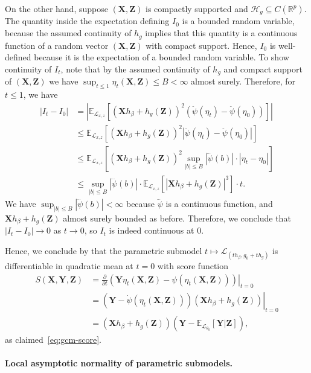 \documentclass[aos]{imsart}
\theoremstyle{plain}
\theoremstyle{remark}
\newcommand{\E}{\mathbb E}								%
\newcommand{\R}{\mathbb{R}}								%
\newcommand{\prx}{\bm X}								%
\newcommand{\prz}{\bm Z}								%
\newcommand{\pry}{{\bm Y}}								%
\newcommand{\law}{\mathcal L}							%
\renewcommand{\H}{\mathcal H}		 					%
\begin{document}
On the other hand, suppose $(\prx,\prz)$ is compactly supported and $\H_g \subseteq C(\R^p)$. The quantity inside the expectation defining $I_0$ is a bounded random variable, because the assumed continuity of $h_g$ implies that this quantity is a continuous function of a random vector $(\prx, \prz)$ with compact support. Hence, $I_0$ is well-defined because it is the expectation of a bounded random variable. To show continuity of $I_t$, note that by the assumed continuity of $h_g$ and compact support of $(\prx,\prz)$ we have $\sup_{t \leq 1} \eta_t(\prx,\prz) \leq B < \infty$ almost surely. Therefore, for $t \leq 1$, we have
\begin{align*}
	|I_t-I_0|
	&
	=\left|\E_{\law_{x,z}}\left[(\prx h_\beta+h_g(\prz))^2(\ddot{\psi}(\eta_t)-\ddot{\psi}(\eta_0))\right]\right|\\
	&
	\leq \E_{\law_{x,z}}\left[(\prx h_\beta+h_g(\prz))^2|\ddot{\psi}(\eta_t)-\ddot{\psi}(\eta_0)|\right]\\
	&
	\leq \E_{\law_{x,z}}\left[(\prx h_\beta+h_g(\prz))^2\sup_{|b| \leq B}|\dddot{\psi}(b)| \cdot |\eta_t-\eta_0|\right]\\
	&
	\leq \sup_{|b| \leq B}|\dddot{\psi}(b)| \cdot \E_{\law_{x,z}}\left[|\prx h_\beta+h_g(\prz)|^3\right] \cdot t.
\end{align*}
We have $\sup_{|b| \leq B}|\dddot{\psi}(b)| < \infty$ because $\dddot \psi$ is a continuous function, and $\prx h_\beta+h_g(\prz)$ almost surely bounded as before. Therefore, we conclude that $|I_t - I_0| \rightarrow 0$ as $t \rightarrow 0$, so $I_t$ is indeed continuous at 0.

Hence, we conclude by \citet[Lemma 7.6]{VDV1998} that the parametric submodel $t \mapsto \law_{(th_\beta, g_0 + th_g)}$ is differentiable in quadratic mean at $t = 0$ with score function
\begin{align*}
S(\prx, \pry, \prz) &= \left.\frac{\partial}{\partial t}(\pry \eta_t(\prx, \prz) - \psi(\eta_t(\prx, \prz)))\right|_{t = 0} \\
&= \left.(\pry-\dot{\psi}(\eta_t(\prx, \prz)))(\prx h_\beta+h_g(\prz))\right|_{t = 0} \\
&= (\prx h_\beta+h_g(\prz))(\pry-\E_{\law_{\theta_0}}[\pry|\prz]),
\end{align*}
as claimed~\eqref{eq:gcm-score}.

\paragraph*{Local asymptotic normality of parametric submodels.}
\end{document}
